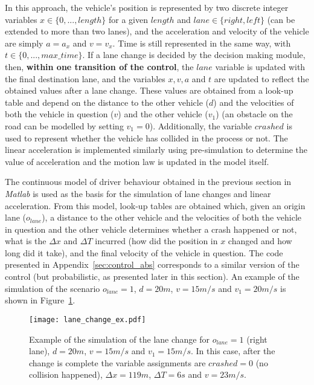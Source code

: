 In this approach, the vehicle's position is represented by two discrete integer variables $x \in \{0,...,length\}$ for a given $length$ and $lane \in \{right, left\}$ (can be extended to more than two lanes), and the acceleration and velocity of the vehicle are simply $a = a_x$ and $v = v_x$. Time is still represented in the same way, with $t \in \{0,...,max\_time\}$. If a lane change is decided by the decision making module, then, \textbf{within one transition of the control}, the $lane$ variable is updated with the final destination lane, and the variables $x, v, a$ and $t$ are updated to reflect the obtained values after a lane change. These values are obtained from a look-up table and depend on the distance to the other vehicle ($d$) and the velocities of both the vehicle in question ($v$) and the other vehicle ($v_1$) (an obstacle on the road can be modelled by setting $v_1 = 0$). Additionally, the variable $crashed$ is used to represent whether the vehicle has collided in the process or not. The linear acceleration is implemented similarly using pre-simulation to determine the value of acceleration and the motion law is updated in the model itself.

The continuous model of driver behaviour obtained in the previous section in \textit{Matlab} is used as the basis for the simulation of lane changes and linear acceleration. From this model, look-up tables are obtained which, given an origin lane ($o_{lane}$), a distance to the other vehicle and the velocities of both the vehicle in question and the other vehicle determines whether a crash happened or not, what is the $\Delta x$ and $\Delta T$ incurred (how did the position in $x$ changed and how long did it take), and the final velocity of the vehicle in question. The code presented in Appendix~\ref{sec:control_abs} corresponds to a similar version of the control (but probabilistic, as presented later in this section). An example of the simulation of the scenario $o_{lane} = 1$, $d = 20m$, $v = 15m/s$ and $v_1 = 20m/s$ is shown in Figure~\ref{fig:lane_change_ex}.

\begin{figure}[h]
    \centering
    \texttt{[image: lane\_change\_ex.pdf]}
    \caption{Example of the simulation of the lane change for $o_{lane} = 1$ (right lane), $d = 20m$, $v = 15m/s$ and $v_1 = 15m/s$. In this case, after the change is complete the variable assignments are $crashed = 0$ (no collision happened), $\Delta x = 119m$, $\Delta T = 6s$ and $v = 23m/s$.}
    \label{fig:lane_change_ex}
\end{figure}


